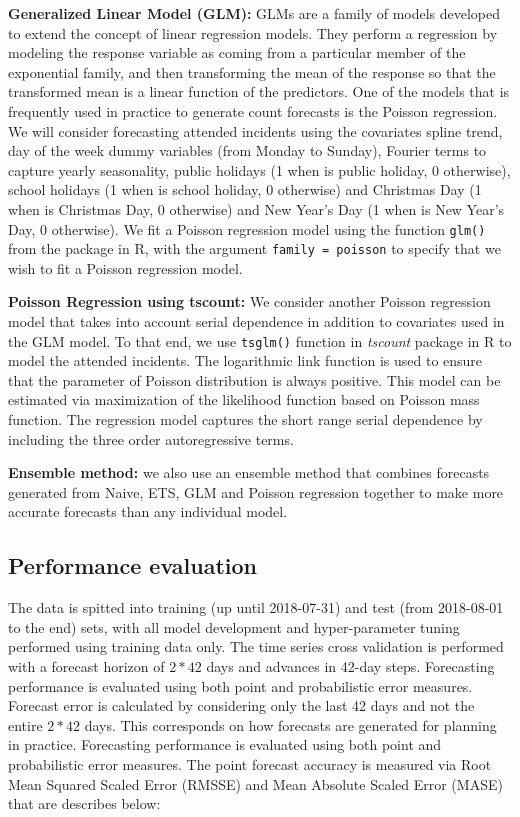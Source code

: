 \documentclass[
  authoryear,
  preprint,
  3p]{elsarticle}
\begin{document}
\textbf{Generalized Linear Model (GLM): } GLMs are a family of models
developed to extend the concept of linear regression models. They
perform a regression by modeling the response variable as coming from a
particular member of the exponential family, and then transforming the
mean of the response so that the transformed mean is a linear function
of the predictors. One of the models that is frequently used in practice
to generate count forecasts is the Poisson regression. We will consider
forecasting attended incidents using the covariates spline trend, day of
the week dummy variables (from Monday to Sunday), Fourier terms to
capture yearly seasonality, public holidays (1 when is public holiday, 0
otherwise), school holidays (1 when is school holiday, 0 otherwise) and
Christmas Day (1 when is Christmas Day, 0 otherwise) and New Year's Day
(1 when is New Year's Day, 0 otherwise). We fit a Poisson regression
model using the function \texttt{glm()} from the package in R, with the
argument \texttt{family\ =\ poisson} to specify that we wish to fit a
Poisson regression model.

\textbf{Poisson Regression using tscount: } We consider another Poisson
regression model that takes into account serial dependence in addition
to covariates used in the GLM model. To that end, we use
\texttt{tsglm()} function in \emph{tscount} package in R to model the
attended incidents. The logarithmic link function is used to ensure that
the parameter of Poisson distribution is always positive. This model can
be estimated via maximization of the likelihood function based on
Poisson mass function. The regression model captures the short range
serial dependence by including the three order autoregressive terms.

\textbf{Ensemble method:} we also use an ensemble method that combines
forecasts generated from Naive, ETS, GLM and Poisson regression together
to make more accurate forecasts than any individual model.

\hypertarget{performance-evaluation}{%
\subsection{Performance evaluation}\label{performance-evaluation}}

The data is spitted into training (up until 2018-07-31) and test (from
2018-08-01 to the end) sets, with all model development and
hyper-parameter tuning performed using training data only. The time
series cross validation is performed with a forecast horizon of \(2*42\)
days and advances in 42-day steps. Forecasting performance is evaluated
using both point and probabilistic error measures. Forecast error is
calculated by considering only the last 42 days and not the entire
\(2*42\) days. This corresponds on how forecasts are generated for
planning in practice. Forecasting performance is evaluated using both
point and probabilistic error measures. The point forecast accuracy is
measured via Root Mean Squared Scaled Error (RMSSE) and Mean Absolute
Scaled Error (MASE) that are describes below:
\end{document}
